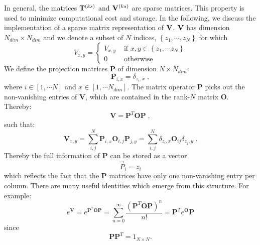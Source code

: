 In general, the matrices ${\bf T}^{(ks)}$ and ${\bf V}^{(ks)}$ are sparse matrices.  This property is used to minimize computational cost and storage.
In the following, we discuss the implementation of a sparse matrix representation of ${\bf V}$.   ${\bf V}$ has dimension  $N_{dim} \times N_{dim} $   and we denote a subset of $N$ indices,  $ \left\{z_{1},\cdots,  z_{N}  \right\}$ 
for which
\begin{equation}
V_{x,y}  =
\left\{\begin{matrix}  V_{x,y}  &  \text{ if }   x, y  \in \left\{ z_1, \cdots z_N \right\}\\ 
                                  0         &  \text{ otherwise } 
      \end{matrix}\right.
\end{equation}
 We define the projection matrices $\mathbf{P}$ of dimension $N \times N_{dim}$:
\begin{equation}
\bm{P}_{i,x}=\delta_{z_{i},x}\;,
\end{equation}
where $i \in [1,\cdots N ]$ and $ x  \in [1,\cdots N_{dim}]$. The matrix operator $\bm{P}$ picks out the non-vanishing entries of $\bm{V}$, 
which are contained in the rank-$N$  matrix $\bm{O}$.  Thereby: 
\begin{equation}
\bm{V} =\bm{P}^{T} \bm{O} \bm{P}\;,
\end{equation}
such that:
\begin{equation}
\bm{V}_{x,y} = \sum\limits_{i,j}^{N}  \bm{P}_{i,x}  \bm{O}_{i,j} \bm{P}_{j,y}=\sum\limits_{i,j}^{N} \delta_{z_{i},x}  \bm{O}_{ij} \delta_{z_{j},y} \;.
\end{equation}
Thereby the full information of $\bm{P}$ can be stored as a vector   
\begin{equation}
     \vec{P}_i = z_i
\end{equation} 
which reflects the fact that the $\bm{P}$ matrices have only one non-vanishing entry per column. There are  many useful  identities which emerge from this  structure. For example: 
\begin{equation}
	e^{\bm{V}} =  e^{\bm{P}^{T} \bm{O} \bm{P}}   = \sum_{n=0}^{\infty}  \frac{\left( \bm{P}^{T} \bm{O} \bm{P} \right)^n}{n!} =  \bm{P}^{T} e^{ \bm{O} } \bm{P}
\end{equation}
since 
\begin{equation}
	 \bm{P} \bm{P}^{T}= 1_{N\times N}.
\end{equation}

